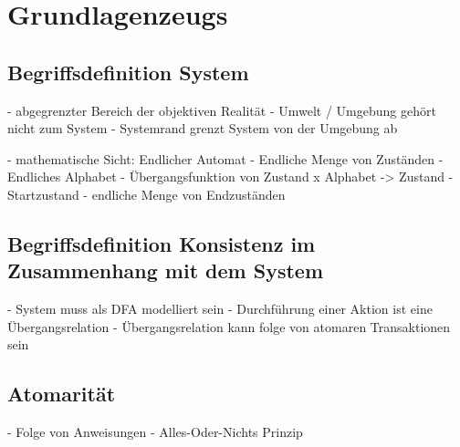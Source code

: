 \section{Grundlagenzeugs}

\subsection{Begriffsdefinition System}
- abgegrenzter Bereich der objektiven Realität
- Umwelt / Umgebung gehört nicht zum System
- Systemrand grenzt System von der Umgebung ab

- mathematische Sicht: Endlicher Automat
- Endliche Menge von Zuständen
- Endliches Alphabet
- Übergangsfunktion von Zustand x Alphabet -> Zustand
- Startzustand
- endliche Menge von Endzuständen

\subsection{Begriffsdefinition Konsistenz im Zusammenhang mit dem System}
- System muss als DFA modelliert sein
- Durchführung einer Aktion ist eine Übergangsrelation
- Übergangsrelation kann folge von atomaren Transaktionen sein

\subsection{Atomarität}
- Folge von Anweisungen
- Alles-Oder-Nichts Prinzip